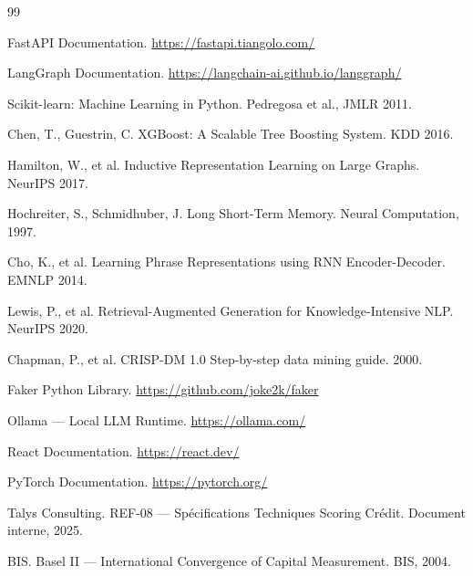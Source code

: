 \begin{thebibliography}{99}

FastAPI Documentation. \url{https://fastapi.tiangolo.com/}

LangGraph Documentation. \url{https://langchain-ai.github.io/langgraph/}

Scikit-learn: Machine Learning in Python. Pedregosa et al., JMLR 2011.

Chen, T., Guestrin, C. XGBoost: A Scalable Tree Boosting System. KDD 2016.

Hamilton, W., et al. Inductive Representation Learning on Large Graphs. NeurIPS 2017.

Hochreiter, S., Schmidhuber, J. Long Short-Term Memory. Neural Computation, 1997.

Cho, K., et al. Learning Phrase Representations using RNN Encoder-Decoder. EMNLP 2014.

Lewis, P., et al. Retrieval-Augmented Generation for Knowledge-Intensive NLP. NeurIPS 2020.

Chapman, P., et al. CRISP-DM 1.0 Step-by-step data mining guide. 2000.

Faker Python Library. \url{https://github.com/joke2k/faker}

Ollama — Local LLM Runtime. \url{https://ollama.com/}

React Documentation. \url{https://react.dev/}

PyTorch Documentation. \url{https://pytorch.org/}

Talys Consulting. REF-08 — Spécifications Techniques Scoring Crédit. Document interne, 2025.

BIS. Basel II — International Convergence of Capital Measurement. BIS, 2004.

\end{thebibliography}
